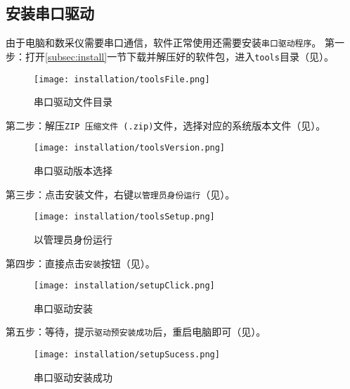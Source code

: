 \subsection{安装串口驱动}
由于电脑和数采仪需要串口通信，软件正常使用还需要安装\lstinline{串口驱动程序}。
第一步：打开\ref{subsec:install}一节下载并解压好的软件包，进入\lstinline{tools}目录（见）。
\begin{figure}[htbp]
    \centering
    \texttt{[image: installation/toolsFile.png]}
    \caption{ 串口驱动文件目录 \label{fig:toolsFile}}
\end{figure}
第二步：解压\lstinline{ZIP 压缩文件 (.zip)}文件，选择对应的系统版本文件（见）。
\begin{figure}[htbp]
    \centering
    \texttt{[image: installation/toolsVersion.png]}
    \caption{ 串口驱动版本选择 \label{fig:toolsVersion}}
\end{figure}
第三步：点击安装文件，右键\lstinline{以管理员身份运行}（见）。
\begin{figure}[htbp]
    \centering
    \texttt{[image: installation/toolsSetup.png]}
    \caption{ 以管理员身份运行 \label{fig:toolsSetup}}
\end{figure}
第四步：直接点击\lstinline{安装}按钮（见）。
\begin{figure}[htbp]
    \centering
    \texttt{[image: installation/setupClick.png]}
    \caption{ 串口驱动安装 \label{fig:setupClick}}
\end{figure}
第五步：等待，提示\lstinline{驱动预安装成功}后，重启电脑即可（见）。
\begin{figure}[htbp]
    \centering
    \texttt{[image: installation/setupSucess.png]}
    \caption{ 串口驱动安装成功 \label{fig:setupSucess}}
\end{figure}
